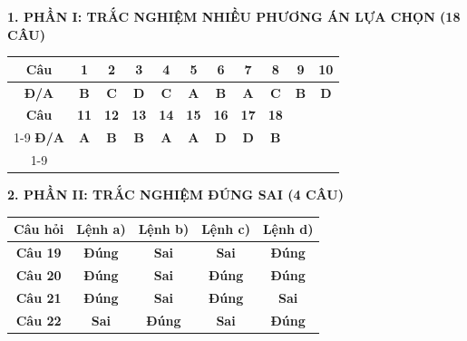 \documentclass[11pt,a4paper]{article}
\begin{document}
\vspace{2pt}
\noindent
\textbf{\color{mainGreen}1. PHẦN I: TRẮC NGHIỆM NHIỀU PHƯƠNG ÁN LỰA CHỌN (18 CÂU)}
\begin{center}
\renewcommand{\arraystretch}{1.2}
\begin{tabular}{|c|c|c|c|c|c|c|c|c|c|c|}
\hline
\rowcolor{tableGreen}
\textbf{Câu} & \textbf{1} & \textbf{2} & \textbf{3} & \textbf{4} & \textbf{5} & \textbf{6} & \textbf{7} & \textbf{8} & \textbf{9} & \textbf{10} \\
\hline
\textbf{Đ/A} & \textbf{\color{hfRed}B} & \textbf{\color{hfRed}C} & \textbf{\color{hfRed}D} & \textbf{\color{hfRed}C} & \textbf{\color{hfRed}A} & \textbf{\color{hfRed}B} & \textbf{\color{hfRed}A} & \textbf{\color{hfRed}C} & \textbf{\color{hfRed}B} & \textbf{\color{hfRed}D} \\
\hline
\rowcolor{tableGreen}
\textbf{Câu} & \textbf{11} & \textbf{12} & \textbf{13} & \textbf{14} & \textbf{15} & \textbf{16} & \textbf{17} & \textbf{18} & \multicolumn{2}{c|}{} \\
\cline{1-9}
\textbf{Đ/A} & \textbf{\color{hfRed}A} & \textbf{\color{hfRed}B} & \textbf{\color{hfRed}B} & \textbf{\color{hfRed}A} & \textbf{\color{hfRed}A} & \textbf{\color{hfRed}D} & \textbf{\color{hfRed}D} & \textbf{\color{hfRed}B} & \multicolumn{2}{c|}{} \\
\cline{1-9}
\end{tabular}
\end{center}

\vspace{2pt}
\noindent
\textbf{\color{mainGreen}2. PHẦN II: TRẮC NGHIỆM ĐÚNG SAI (4 CÂU)}
\begin{center}
\renewcommand{\arraystretch}{1.2}
\begin{tabular}{|c|c|c|c|c|}
\hline
\rowcolor{tableGreen}
\textbf{Câu hỏi} & \textbf{Lệnh a)} & \textbf{Lệnh b)} & \textbf{Lệnh c)} & \textbf{Lệnh d)} \\
\hline
\textbf{Câu 19} & \textbf{\color{hfRed}Đúng} & \textbf{Sai} & \textbf{Sai} & \textbf{\color{hfRed}Đúng} \\
\hline
\textbf{Câu 20} & \textbf{\color{hfRed}Đúng} & \textbf{Sai} & \textbf{\color{hfRed}Đúng} & \textbf{\color{hfRed}Đúng} \\
\hline
\textbf{Câu 21} & \textbf{\color{hfRed}Đúng} & \textbf{Sai} & \textbf{\color{hfRed}Đúng} & \textbf{Sai} \\
\hline
\textbf{Câu 22} & \textbf{Sai} & \textbf{\color{hfRed}Đúng} & \textbf{Sai} & \textbf{\color{hfRed}Đúng} \\
\hline
\end{tabular}
\end{center}
\end{document}
